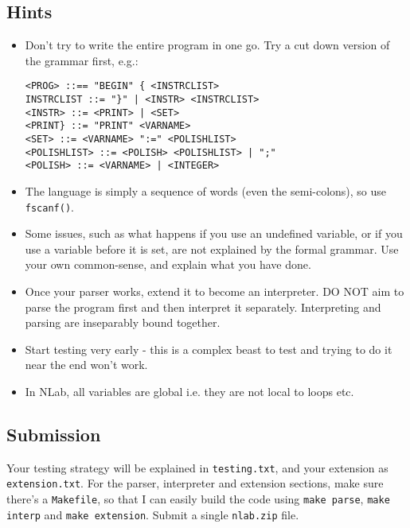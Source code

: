\begin{exercise}
\subsection*{Hints}
\begin{itemize}
\item Don't try to write the entire program in one go. Try a cut
down version of the grammar first, e.g.:
\begin{verbatim}
<PROG> ::== "BEGIN" { <INSTRCLIST>
INSTRCLIST ::= "}" | <INSTR> <INSTRCLIST>
<INSTR> ::= <PRINT> | <SET>
<PRINT} ::= "PRINT" <VARNAME>
<SET> ::= <VARNAME> ":=" <POLISHLIST>
<POLISHLIST> ::= <POLISH> <POLISHLIST> | ";"
<POLISH> ::= <VARNAME> | <INTEGER>
\end{verbatim}
\item The language is simply a sequence of words (even the semi-colons),
so use \verb^fscanf()^.
\item Some issues, such as what happens if you use an undefined variable,
or if you use a variable before it is set, are not explained by the formal
grammar. Use your own common-sense, and explain what you have done.
\item Once your parser works, extend it to become an interpreter. DO NOT
aim to parse the program first and then interpret it separately. Interpreting
and parsing are inseparably bound together.
\item Start testing very early - this is a complex beast to test and trying to
do it near the end won't work.
\item In NLab, all variables are global i.e. they are not local to loops etc.
\end{itemize}

\subsection*{Submission}
Your testing strategy will be explained in \verb^testing.txt^, and your extension
as \verb^extension.txt^. For the parser, interpreter and extension sections, make
sure there's a \verb^Makefile^, so that I can easily build the code using \verb^make parse^,
\verb^make interp^ and \verb^make extension^. Submit a single \verb^nlab.zip^ file.

\end{exercise}
